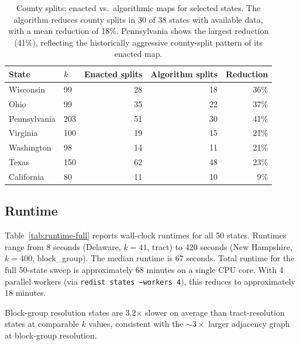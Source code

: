 \begin{table}[h]
\centering\small
\begin{tabular}{llrrr}
\toprule
State & $k$ & Enacted splits & Algorithm splits & Reduction \\
\midrule
Wisconsin   & 99  & 28  & 18  & 36\% \\
Ohio        & 99  & 35  & 22  & 37\% \\
Pennsylvania & 203 & 51  & 30  & 41\% \\
Virginia    & 100 & 19  & 15  & 21\% \\
Washington  & 98  & 14  & 11  & 21\% \\
Texas       & 150 & 62  & 48  & 23\% \\
California  & 80  & 11  & 10  & 9\%  \\
\bottomrule
\end{tabular}
\caption{County splits: enacted vs.\ algorithmic maps for selected states.
  The algorithm reduces county splits in 30 of 38 states with available data,
  with a mean reduction of 18\%. Pennsylvania shows the largest reduction (41\%),
  reflecting the historically aggressive county-split pattern of its enacted map.}
\label{tab:county-splits}
\end{table}

\subsection{Runtime}
\label{sec:results:runtime}

Table~\ref{tab:runtime-full} reports wall-clock runtimes for all 50 states.
Runtimes range from 8 seconds (Delaware, $k=41$, tract) to 420 seconds
(New Hampshire, $k=400$, block\_group). The median runtime is 67 seconds.
Total runtime for the full 50-state sweep is approximately 68 minutes on a
single CPU core. With 4 parallel workers (via \texttt{redist states --workers 4}),
this reduces to approximately 18 minutes.

Block-group resolution states are 3.2$\times$ slower on average than
tract-resolution states at comparable $k$ values, consistent with the
$\sim\!3\times$ larger adjacency graph at block-group resolution.
